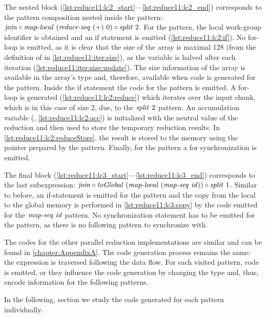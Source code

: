 The nested block (\autoref{lst:reduce11:lc2_start}---\autoref{lst:reduce11:lc2_end}) corresponds to the pattern composition nested inside the \iterateN pattern:
$\text{\textit{join}} \circ \text{\textit{map-local}}\ (\text{\textit{reduce-seq}}\ (+)\ 0) \circ \text{\textit{split}}\ 2$.
For the \mapLocal pattern, the local work-group identifier is obtained and an if statement is emitted (\autoref{lst:reduce11:lc2:if}).
No for-loop is emitted, as it is clear that the size of the array is maximal 128 (from the definition of  in \autoref{lst:reduce11:iter:size}), as the variable is halved after each iteration (\autoref{lst:reduce11:iter:size:update}).
The size information of the array is available in the array's type and, therefore, available when code is generated for the \mapLocal pattern.
Inside the if statement the code for the \reduceSeq pattern is emitted.
A for-loop is generated (\autoref{lst:reduce11:lc2:reduce}) which iterates over the input chunk, which is in this case of size 2, due, to the $\text{\textit{split}}\ 2$ pattern.
An accumulation variable (, \autoref{lst:reduce11:lc2:acc}) is initialized with the neutral value of the reduction and then used to store the temporary reduction results.
In \autoref{lst:reduce11:lc2:reduceStore}, the result is stored to the memory using the  pointer prepared by the \iterateN pattern.
Finally, for the \mapLocal pattern a  for synchronization is emitted.

The final block (\autoref{lst:reduce11:lc3_start}---\autoref{lst:reduce11:lc3_end}) corresponds to the last subexpression:
$\text{\textit{join}} \circ \text{\textit{toGlobal}}\ (\text{\textit{map-local}}\ (\text{\textit{map-seq}}\ \text{\textit{id}})) \circ \text{\textit{split}}\ 1$.
Similar to before, an if-statement is emitted for the \mapLocal pattern and the copy from the local to the global memory is performed in \autoref{lst:reduce11:lc3:copy} by the code emitted for the $\text{\textit{map-seq}}\ \text{\textit{id}}$ pattern.
No synchronization statement has to be emitted for the \mapLocal pattern, as there is no following pattern to synchronize with.

\bigskip

The \OpenCL codes for the other parallel reduction implementations are similar and can be found in \autoref{chapter:AppendixA}.
The code generation process remains the same:
the expression is traversed following the data flow.
For each visited pattern, \OpenCL code is emitted, or they influence the code generation by changing the type and, thus, encode information for the following patterns.

In the following, section we study the \OpenCL code generated for each pattern individually.





